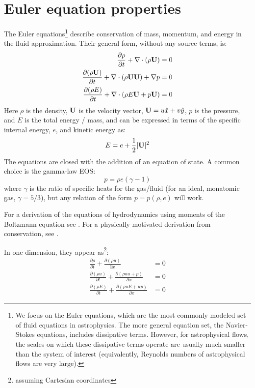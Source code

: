 \label{ch:compressible-theory}


\section{Euler equation properties}

The Euler equations\footnote{ We focus on the Euler equations, which
are the most commonly modeled set of fluid equations in astrophysics.
The more general equation set, the Navier-Stokes equations, includes
dissipative terms.  However, for astrophysical flows, the scales on
which these dissipative terms operate are usually much smaller than
the system of interest (equivalently, Reynolds numbers of
astrophysical flows are very large).} describe conservation of 
mass, momentum, and energy in the fluid approximation.  Their general
form, without any source terms, is:  
\begin{align}
{\frac{{\partial\rho}}{\partial t}} + \nabla \cdot (\rho {\bf U}) &= 0 \\
{\frac{{\partial(\rho {\bf U})}}{\partial t}} + \nabla \cdot (\rho {\bf U} {\bf U}) + \nabla p &= 0 \\
{\frac{{\partial(\rho E)}}{\partial t}} + \nabla \cdot (\rho E {\bf U} + p {\bf U} ) &= 0 
\end{align}
Here $\rho$ is the density, ${\bf U}$ is the velocity vector, ${\bf U} =
u\hat{x} + v\hat{y}$, $p$ is the pressure, and $E$ is the total energy
/ mass, and can be expressed in terms of the specific internal energy,
$e$, and kinetic energy as:
\begin{equation}
E = e + \frac{1}{2} |{\bf U}|^2
\end{equation}
The equations are closed with the addition of an equation of state.  A common
choice is the gamma-law EOS:
\begin{equation}
p = \rho e(\gamma - 1)
\end{equation}
where $\gamma$ is the ratio of specific heats for the gas/fluid (for
an ideal, monatomic gas, $\gamma = 5/3$), but any relation of the form
$p = p(\rho, e)$ will work.

For a derivation of the equations of hydrodynamics using moments of
the Boltzmann equation see \cite{shu,choudhuri}.  For a
physically-motivated derivation from conservation, see \cite{leveque:2002}.

In one dimension, they appear as\footnote{assuming Cartesian coordinates}:
\begin{align}
\frac{\partial \rho}{\partial t} +
    \frac{\partial (\rho u)}{\partial x} &= 0 \\
%
\frac{\partial(\rho u)}{\partial t} +
    \frac{\partial (\rho uu + p)}{\partial x} &= 0 \\
%
\frac{\partial(\rho E)}{\partial t} +
    \frac{\partial(\rho u E + u p)}{\partial x} &= 0
\end{align}

